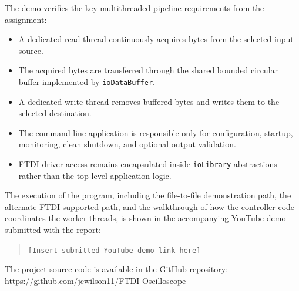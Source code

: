 The demo verifies the key multithreaded pipeline requirements from the assignment:
\begin{itemize}
    \item A dedicated read thread continuously acquires bytes from the selected input source.
    \item The acquired bytes are transferred through the shared bounded circular buffer implemented by \texttt{ioDataBuffer}.
    \item A dedicated write thread removes buffered bytes and writes them to the selected destination.
    \item The command-line application is responsible only for configuration, startup, monitoring, clean shutdown, and optional output validation.
    \item FTDI driver access remains encapsulated inside \texttt{ioLibrary} abstractions rather than the top-level application logic.
\end{itemize}

The execution of the program, including the file-to-file demonstration path, the alternate FTDI-supported path, and the walkthrough of how the controller code coordinates the worker threads, is shown in the accompanying YouTube demo submitted with the report:

\begin{quote}
\texttt{[Insert submitted YouTube demo link here]}
\end{quote}

The project source code is available in the GitHub repository:
\url{https://github.com/jcwilson11/FTDI-Oscilloscope}
